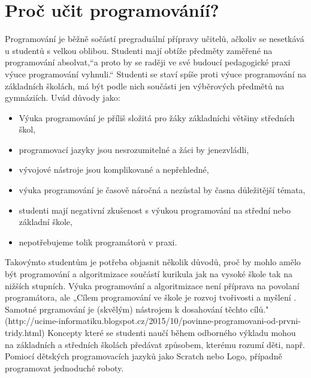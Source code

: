 \documentclass[FP,DP]{tulthesis}
\begin{document}
{{{{{{{\section{Proč učit programováníí?}

Programování je běžně sočástí  pregraduální  přípravy učitelů, ačkoliv se nesetkává u studentů s velkou oblibou. Studenti mají obtíže předměty zaměřené na programování absolvat,“a proto by se raději ve své budoucí pedagogické praxi výuce programování vyhnuli.“ Studenti se staví spíše proti výuce programování na základních školách, má být podle nich součásti jen výběrových předmětů na gymnáziích. Uvád důvody jako:
\vspace{2mm}\begin{itemize}[nosep]
  	\item Výuka programování je příliš složitá pro žáky základníchi většiny středních škol,
	\item programovací jazyky jsou nesrozumitelné a žáci by jenezvládli,
	\item vývojové nástroje jsou komplikované a nepřehledné,
	\item výuka programování je časově náročná a nezůstal by časna důležitější témata,
	\item studenti mají negativní zkušenost s výukou programování na střední nebo základní škole,
	\item nepotřebujeme tolik programátorů v praxi.
\end{itemize}
\vspace{2mm}Takovýmto studentům je potřeba objasnit několik důvodů, proč by mohlo amělo být programování a algoritmizace součástí kurikula jak na vysoké škole tak na nižších stupních.
Výuka programování a algoritmizace není příprava na povolaní programátora, ale „Cílem programování ve škole je rozvoj tvořivosti a myšlení . Samotné prgramování je (skvělým) nástrojem k dosahování těchto cílů." (http://ucime-informatiku.blogspot.cz/2015/10/povinne-programovani-od-prvni-tridy.html) Koncepty které se studenti naučí během odborného výkladu mohou na základních a středních školách předávat způsobem, kterému rozumí děti, např. Pomiocí dětských programovacích jazyků jako Scratch nebo Logo, případně programovat jednoduché roboty.

}}}}}}}
\end{document}
